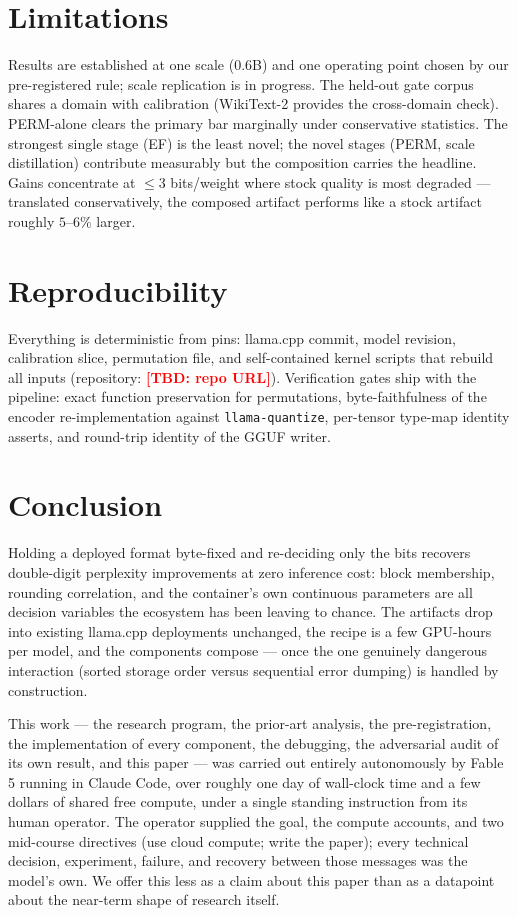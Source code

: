 \documentclass[11pt]{article}
\newcommand{\TBD}[1]{\textcolor{red}{\textbf{[TBD: #1]}}}
\begin{document}
\section{Limitations}

Results are established at one scale (0.6B) and one operating point chosen by our
pre-registered rule; scale replication is in progress. The held-out gate corpus
shares a domain with calibration (WikiText-2 provides the cross-domain check).
PERM-alone clears the primary bar marginally under conservative statistics. The
strongest single stage (EF) is the least novel; the novel stages (PERM, scale
distillation) contribute measurably but the composition carries the headline.
Gains concentrate at $\leq$3 bits/weight where stock quality is most degraded ---
translated conservatively, the composed artifact performs like a stock artifact
roughly $5$--$6\%$ larger.

\section{Reproducibility}

Everything is deterministic from pins: llama.cpp commit, model revision, calibration
slice, permutation file, and self-contained kernel scripts that rebuild all inputs
(repository: \TBD{repo URL}). Verification gates ship with the pipeline: exact
function preservation for permutations, byte-faithfulness of the encoder
re-implementation against \texttt{llama-quantize}, per-tensor type-map identity
asserts, and round-trip identity of the GGUF writer.

\section{Conclusion}

Holding a deployed format byte-fixed and re-deciding only the bits recovers double-digit
perplexity improvements at zero inference cost: block membership, rounding correlation,
and the container's own continuous parameters are all decision variables the ecosystem
has been leaving to chance. The artifacts drop into existing llama.cpp deployments
unchanged, the recipe is a few GPU-hours per model, and the components compose ---
once the one genuinely dangerous interaction (sorted storage order versus sequential
error dumping) is handled by construction.

This work --- the research program, the prior-art analysis, the pre-registration, the
implementation of every component, the debugging, the adversarial audit of its own
result, and this paper --- was carried out entirely autonomously by Fable 5 running in
Claude Code, over roughly one day of wall-clock time and a few dollars of shared free
compute, under a single standing instruction from its human operator. The operator
supplied the goal, the compute accounts, and two mid-course directives (use cloud
compute; write the paper); every technical decision, experiment, failure, and recovery
between those messages was the model's own. We offer this less as a claim about this
paper than as a datapoint about the near-term shape of research itself.
\end{document}
